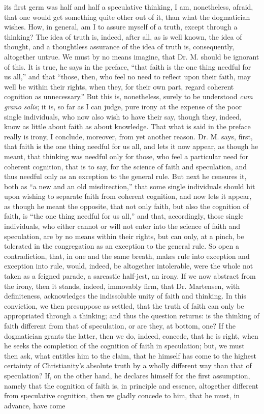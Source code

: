 \documentclass[12pt]{book}
\begin{document}
its first germ was half and half a speculative thinking, I am, nonetheless, afraid, that one would get something quite other out of it, than what the dogmatician wishes. How, in general, am I to assure myself of a truth, except through a thinking? The idea of truth is, indeed, after all, as is well known, the idea of thought, and a thoughtless assurance of the idea of truth is, consequently, altogether untrue. We must by no means imagine, that Dr. M. should be ignorant of this. It is true, he says in the preface, ``that faith is the one thing needful for us all,'' and that ``those, then, who feel no need to reflect upon their faith, may well be within their rights, when they, for their own part, regard coherent cognition as unnecessary.'' But this is, nonetheless, surely to be understood \textit{cum grano salis}; it is, so far as I can judge, pure irony at the expense of the poor single individuals, who now also wish to have their say, though they, indeed, know as little about faith as about knowledge. That what is said in the preface really is irony, I conclude, moreover, from yet another reason. Dr. M. says, first, that faith is the one thing needful for us all, and lets it now appear, as though he meant, that thinking was needful only for those, who feel a particular need for coherent cognition, that is to say, for the science of faith and speculation, and thus needful only as an exception to the general rule. But next he censures it, both as ``a new and an old misdirection,'' that some single individuals should hit upon wishing to separate faith from coherent cognition, and now lets it appear,
as though he meant the opposite, that not only faith, but also the cognition of faith, is ``the one thing needful for us all,'' and that, accordingly, those single individuals, who either cannot or will not enter into the science of faith and speculation, are by no means within their rights, but can only, at a pinch, be tolerated in the congregation as an exception to the general rule. So open a contradiction, that, in one and the same breath, makes rule into exception and exception into rule, would, indeed, be altogether intolerable, were the whole not taken as a feigned parade, a sarcastic half-jest, an irony. If we now abstract from the irony, then it stands, indeed, immovably firm, that Dr. Martensen, with definiteness, acknowledges the indissoluble unity of faith and thinking. In this conviction, we then presuppose as settled, that the truth of faith can only be appropriated through a thinking; and thus the question returns: is the thinking of faith different from that of speculation, or are they, at bottom, one? If the dogmatician grants the latter, then we do, indeed, concede, that he is right, when he seeks the completion of the cognition of faith in speculation; but, we must then ask, what entitles him to the claim, that he himself has come to the highest certainty of Christianity's absolute truth by a wholly different way than that of speculation? If, on the other hand, he declares himself for the first assumption, namely that the cognition of faith is, in principle and essence, altogether different from speculative cognition, then we gladly concede to him, that he must, in advance, have come
\end{document}
